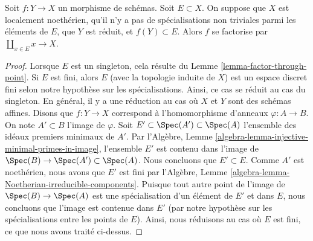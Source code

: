 \begin{lemma}
\label{lemma-factor-through-set-of-points}
Soit $f : Y \to X$ un morphisme de schémas. Soit $E \subset X$. On suppose que
$X$ est localement noethérien, qu'il n'y a pas de spécialisations non triviales
parmi les éléments de $E$, que $Y$ est réduit, et
$f(Y) \subset E$. Alors $f$ se factorise par $\coprod_{x \in E} x \to X$.
\end{lemma}

\begin{proof}
Lorsque $E$ est un singleton, cela
résulte du Lemme \ref{lemma-factor-through-point}. Si $E$ est fini, alors $E$
(avec la topologie induite de $X$) est un espace discret
fini selon notre hypothèse sur les spécialisations. Ainsi,
ce cas se réduit au cas du singleton. En général, il
y a une réduction au cas où $X$ et $Y$ sont des schémas affines.
Disons que $f : Y \to X$ correspond à l'homomorphisme d'anneaux $\varphi : A \to B$.
On note $A' \subset B$ l'image de $\varphi$. Soit $E' \subset \Spec(A') \subset \Spec(A)$ l'ensemble des
idéaux premiers minimaux de $A'$. Par l'Algèbre, Lemme \ref{algebra-lemma-injective-minimal-primes-in-image}, l'ensemble
$E'$ est contenu dans l'image
de $\Spec(B) \to \Spec(A') \subset \Spec(A)$. Nous concluons que $E' \subset E$. Comme $A'$ est noethérien,
nous avons que $E'$ est fini par l'Algèbre, Lemme
\ref{algebra-lemma-Noetherian-irreducible-components}. Puisque tout autre point de l'image de $\Spec(B) \to \Spec(A)$
est une spécialisation d'un élément de $E'$ et dans $E$,
nous concluons que l'image est contenue dans $E'$ (par
notre hypothèse sur les spécialisations entre les points de $E$).
Ainsi, nous réduisons au cas où $E$ est fini,
ce que nous avons traité ci-dessus.
\end{proof}










